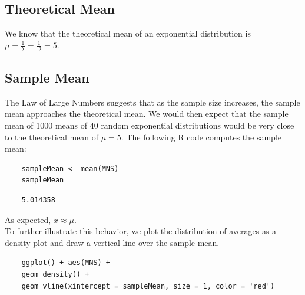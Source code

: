 \documentclass[11pt]{article} %
\begin{document}
\subsection{Theoretical Mean}
	We know that the theoretical mean of an exponential distribution is $\mu = \frac{1}{\lambda} = \frac{1}{.2} = 5$. 
\subsection{Sample Mean}
	The Law of Large Numbers suggests that as the sample size increases, the sample mean approaches the theoretical mean. We would then expect that the sample mean of 1000 means of 40 random exponential distributions would be very close to the theoretical mean of $\mu = 5$.  The following R code computes the sample mean:
\begin{lstlisting}
	sampleMean <- mean(MNS)
	sampleMean
\end{lstlisting} 

\begin{lstlisting}
	5.014358
\end{lstlisting}
	As expected, $\bar{x} \approx \mu$. \\
To further illustrate this behavior, we plot the distribution of averages as a density plot and draw a vertical line over the sample mean. 

\begin{lstlisting}
	ggplot() + aes(MNS) + 
	geom_density() + 
	geom_vline(xintercept = sampleMean, size = 1, color = 'red')
\end{lstlisting}
\end{document}
